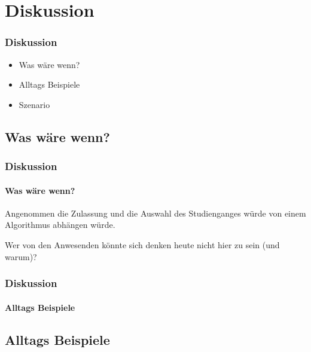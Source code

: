 \section{Diskussion}

\begin{frame}
\frametitle{Diskussion}

\begin{itemize}
\item Was wäre wenn?
\item Alltags Beispiele
\item Szenario
\end{itemize}

\end{frame}

\begin{frame}
\subsection*{Was wäre wenn?}
\frametitle{Diskussion}
\framesubtitle{Was wäre wenn?}
Angenommen die Zulassung und die Auswahl des Studienganges würde von einem Algorithmus abhängen würde.

Wer von den Anwesenden könnte sich denken heute nicht hier zu sein (und warum)? 

\end{frame}

\begin{frame}
\frametitle{Diskussion}
\framesubtitle{Alltags Beispiele}
\subsection*{Alltags Beispiele}
\end{frame}

